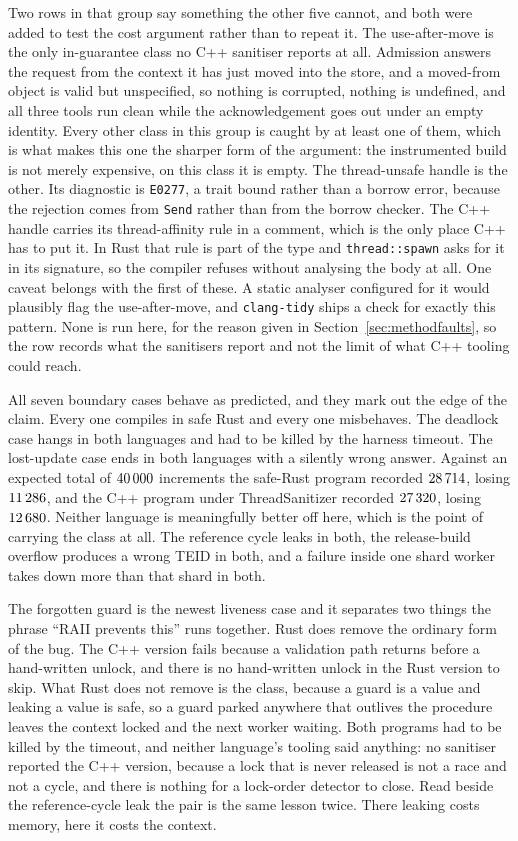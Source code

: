 \documentclass[english,oneside,a4paper,censored,csm,software-track-2020]{HYthesisML}
\begin{document}
Two rows in that group say something the other five cannot, and both were added to test the
cost argument rather than to repeat it. The use-after-move is the only in-guarantee class no
C++ sanitiser reports at all. Admission answers the request from the context it has just moved
into the store, and a moved-from object is valid but unspecified, so nothing is corrupted,
nothing is undefined, and all three tools run clean while the acknowledgement goes out under an
empty identity. Every other class in this group is caught by at least one of them, which is
what makes this one the sharper form of the argument: the instrumented build is not merely
expensive, on this class it is empty. The thread-unsafe handle is the other. Its diagnostic is
\texttt{E0277}, a trait bound rather than a borrow error, because the rejection comes from
\texttt{Send} rather than from the borrow checker. The C++ handle carries its thread-affinity
rule in a comment, which is the only place C++ has to put it. In Rust that rule is part of the
type and \texttt{thread::spawn} asks for it in its signature, so the compiler refuses without
analysing the body at all. One caveat belongs with the first of these. A static analyser
configured for it would plausibly flag the use-after-move, and \texttt{clang-tidy} ships a check
for exactly this pattern. None is run here, for the reason given in
Section~\ref{sec:methodfaults}, so the row records what the sanitisers report and not the limit
of what C++ tooling could reach.

All seven boundary cases behave as predicted, and they mark out the edge of the claim. Every one
compiles in safe
Rust and every one misbehaves. The deadlock case hangs in both languages and had to be killed
by the harness timeout. The lost-update case ends in both languages with a silently wrong
answer. Against an expected total of $40\,000$ increments the safe-Rust program
recorded $28\,714$, losing $11\,286$, and the C++ program under
ThreadSanitizer recorded $27\,320$, losing $12\,680$. Neither language
is meaningfully better off here, which is the point of carrying the class at all. The reference
cycle leaks in both, the release-build overflow produces a
wrong TEID in both, and a failure inside one shard worker takes down more than that shard in
both.

The forgotten guard is the newest liveness case and it separates two things the phrase ``RAII
prevents this'' runs together. Rust does remove the ordinary form of the bug. The C++ version
fails because a validation path returns before a hand-written unlock, and there is no
hand-written unlock in the Rust version to skip. What Rust does not remove is the class, because
a guard is a value and leaking a value is safe, so a guard parked anywhere that outlives the
procedure leaves the context locked and the next worker waiting. Both programs had to be killed
by the timeout, and neither language's tooling said anything: no sanitiser reported the C++
version, because a lock that is never released is not a race and not a cycle, and there is
nothing for a lock-order detector to close. Read beside the reference-cycle leak the pair is the
same lesson twice. There leaking costs memory, here it costs the context.
\end{document}
